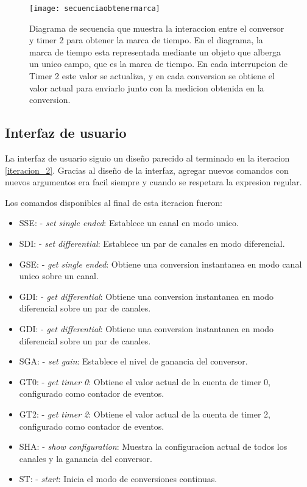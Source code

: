 \begin{figure}[h]
  \centering
  \texttt{[image: secuenciaobtenermarca]}
  \caption[Diagrama de secuencia para la obtencion de una marca de tiempo]{Diagrama de secuencia que muestra la interaccion entre el conversor y timer 2 para obtener la marca de tiempo. En el diagrama, la marca de tiempo esta representada mediante un objeto que alberga un unico campo, que es la marca de tiempo. En cada interrupcion de Timer 2 este valor se actualiza, y en cada conversion se obtiene el valor actual para enviarlo junto con la medicion obtenida en la conversion.}\label{it5:fig:secuenciaobtenermarca}
\end{figure}



\subsection{Interfaz de usuario} %
\label{it5:sub:interfaz_de_usuario}

La interfaz de usuario siguio un diseño parecido al terminado en la iteracion \ref{iteracion_2}. Gracias al diseño de la interfaz, agregar nuevos comandos con nuevos argumentos era facil siempre y cuando se respetara la expresion regular.

Los comandos disponibles al final de esta iteracion fueron:

\begin{itemize}
  \item SSE: - \textit{set single ended}: Establece un canal en modo unico.
  \item SDI: - \textit{set differential}: Establece un par de canales en modo diferencial.
  \item GSE: - \textit{get single ended}: Obtiene una conversion instantanea en modo canal unico sobre un canal.
  \item GDI: - \textit{get differential}: Obtiene una conversion instantanea en modo diferencial sobre un par de canales.
  \item GDI: - \textit{get differential}: Obtiene una conversion instantanea en modo diferencial sobre un par de canales.
  \item SGA: - \textit{set gain}: Establece el nivel de ganancia del conversor.
  \item GT0: - \textit{get timer 0}: Obtiene el valor actual de la cuenta de timer 0, configurado como contador de eventos.
  \item GT2: - \textit{get timer 2}: Obtiene el valor actual de la cuenta de timer 2, configurado como contador de eventos.
  \item SHA: - \textit{show configuration}: Muestra la configuracion actual de todos los canales y la ganancia del conversor.
  \item ST: - \textit{start}: Inicia el modo de conversiones continuas.
\end{itemize}

